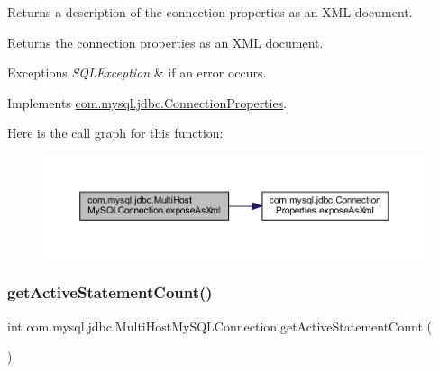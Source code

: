 Returns a description of the connection properties as an X\+ML document.

\begin{DoxyReturn}{Returns}
the connection properties as an X\+ML document. 
\end{DoxyReturn}

\begin{DoxyExceptions}{Exceptions}
{\em S\+Q\+L\+Exception} & if an error occurs. \\
\hline
\end{DoxyExceptions}


Implements \mbox{\hyperlink{interfacecom_1_1mysql_1_1jdbc_1_1_connection_properties_a73482b2a70021a34f84dbc38bf1a105a}{com.\+mysql.\+jdbc.\+Connection\+Properties}}.

Here is the call graph for this function\+:
\nopagebreak
\begin{figure}[H]
\begin{center}
\leavevmode
\includegraphics[width=350pt]{classcom_1_1mysql_1_1jdbc_1_1_multi_host_my_s_q_l_connection_acaae1022ce53ec5e0ba07c1a90244af2_cgraph}
\end{center}
\end{figure}
\mbox{\label{classcom_1_1mysql_1_1jdbc_1_1_multi_host_my_s_q_l_connection_a88b613d50112e08095b5f72017b4deea}} 
\subsubsection{\texorpdfstring{get\+Active\+Statement\+Count()}{getActiveStatementCount()}}
{\footnotesize\ttfamily int com.\+mysql.\+jdbc.\+Multi\+Host\+My\+S\+Q\+L\+Connection.\+get\+Active\+Statement\+Count (\begin{DoxyParamCaption}{ }\end{DoxyParamCaption})}


